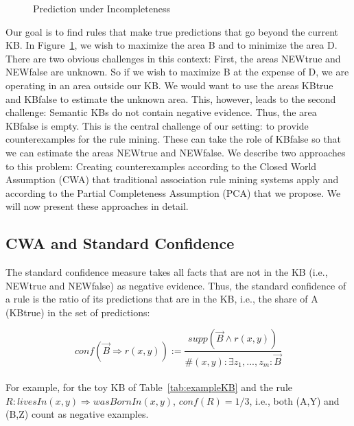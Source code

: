 \begin{figure}[h]
\caption{Prediction under Incompleteness}

\label{fig:prediction}
\end{figure}

Our goal is to find rules that make true predictions that go beyond the current KB.
In Figure~\ref{fig:prediction}, we wish to maximize the area B and to minimize the area D.
There are two obvious challenges in this context: First, the areas NEWtrue and NEWfalse are unknown.
So if we wish to maximize B at the expense of D, we are operating in an area outside our KB.
We would want to use the areas KBtrue and KBfalse to estimate the unknown area.
This, however, leads to the second challenge: Semantic KBs do not contain negative evidence.
Thus, the area KBfalse is empty.
This is the central challenge of our setting: to provide counterexamples for the rule mining.
These can take the role of KBfalse so that we can estimate the areas NEWtrue and NEWfalse.
We describe two approaches to this problem:
Creating counterexamples according to the Closed World Assumption (CWA) that traditional association rule mining systems apply and according to the Partial Completeness Assumption (PCA) that we propose.
We will now present these approaches in detail.



\subsection{CWA and Standard Confidence} \label{subsubsec:stdConf}
The standard confidence measure takes all facts that are not in the KB (i.e., NEWtrue and NEWfalse) as negative evidence.
Thus, the standard confidence of a rule is the ratio of its predictions that are in the KB, i.e., the share of A (KBtrue) in the set of predictions:

\[conf(\vec{B} \Rightarrow r(x,y)) := \frac{supp(\vec{B} \wedge r(x,y))}{\#(x,y): \exists z_1,...,z_m: \vec{B}}\]\\


For example, for the toy KB of Table~\ref{tab:exampleKB} and the rule $R:livesIn(x,y)\Rightarrow wasBornIn(x,y)$,
$conf(R)=1/3$, i.e., both (A,Y) and (B,Z) count as negative examples.

